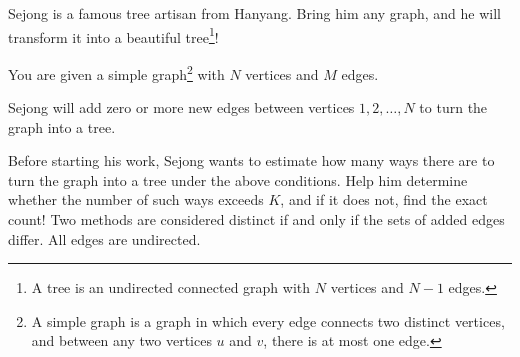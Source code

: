 Sejong is a famous tree artisan from Hanyang. Bring him any graph, and he will transform it into a beautiful tree\footnote{A tree is an undirected connected graph with $N$ vertices and $N-1$ edges.}!

You are given a simple graph\footnote{A simple graph is a graph in which every edge connects two distinct vertices, and between any two vertices $u$ and $v$, there is at most one edge.} with $N$ vertices and $M$ edges.

Sejong will add zero or more new edges between vertices $1, 2, \ldots, N$ to turn the graph into a tree.

Before starting his work, Sejong wants to estimate how many ways there are to turn the graph into a tree under the above conditions. Help him determine whether the number of such ways exceeds $K$, and if it does not, find the exact count! Two methods are considered distinct if and only if the sets of added edges differ. All edges are undirected.